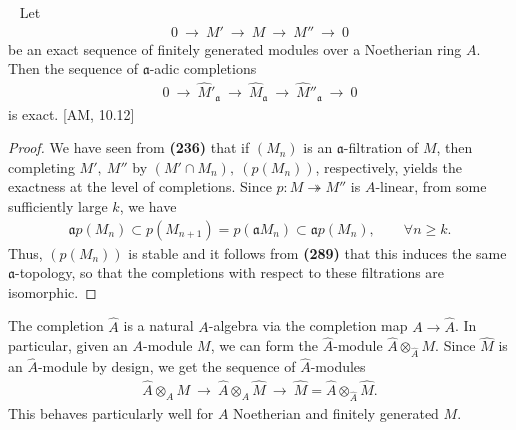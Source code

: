 \documentclass[12pt,a4paper,footinclude=true,headinclude=true]{scrbook} %
\newenvironment{proposition}[2][]
{\renewcommand\theinnercustomprop{#2}\innercustomprop[#1] 
\begin{mdframed}[backgroundcolor=gray!20]\ }
{\end{mdframed}\endinnercustomprop}
\begin{document}
\begin{proposition}{293}
    Let
    \begin{align*}
        0\ \to\ M'\ \to\ M\ \to\ M''\ \to\ 0
    \end{align*}
    be an exact sequence of finitely generated modules over a Noetherian ring $A$. Then the sequence of $\mathfrak{a}$-adic completions
    \begin{align*}
        0\ \to\ \widehat{M}'_\mathfrak{a}\ \to\ \widehat{M}_\mathfrak{a}\ \to\ \widehat{M}''_\mathfrak{a}\ \to\ 0
    \end{align*}
    is exact. [AM, 10.12]
\end{proposition}
\begin{proof}
    We have seen from \textbf{(236)} that if $(M_n)$ is an $\mathfrak{a}$-filtration of $M$, then completing $M',\ M''$ by $(M'\cap M_n),\ (p(M_n))$, respectively, yields the exactness at the level of completions. Since $p:M\twoheadrightarrow M''$ is $A$-linear, from some sufficiently large $k$, we have
    \begin{align*}
        \mathfrak{a}p(M_n)\subset p(M_{n+1})=p(\mathfrak{a}M_n)\subset\mathfrak{a}p(M_n),\qquad\forall n\geq k.
    \end{align*}
    Thus, $(p(M_n))$ is stable and it follows from \textbf{(289)} that this induces the same $\mathfrak{a}$-topology, so that the completions with respect to these filtrations are isomorphic.
\end{proof}

The completion $\widehat{A}$ is a natural $A$-algebra via the completion map $A\to\widehat{A}$. In particular, given an $A$-module $M$, we can form the $\widehat{A}$-module $\widehat{A}\otimes_{\widehat{A}}M$. Since $\widehat{M}$ is an $\widehat{A}$-module by design, we get the sequence of $\widehat{A}$-modules
\begin{align*}
    \widehat{A}\otimes_AM\ \to\ \widehat{A}\otimes_A\widehat{M}\ \to\ \widehat{M}=\widehat{A}\otimes_{\widehat{A}}\widehat{M}.
\end{align*}
This behaves particularly well for $A$ Noetherian and finitely generated $M$.
\end{document}
